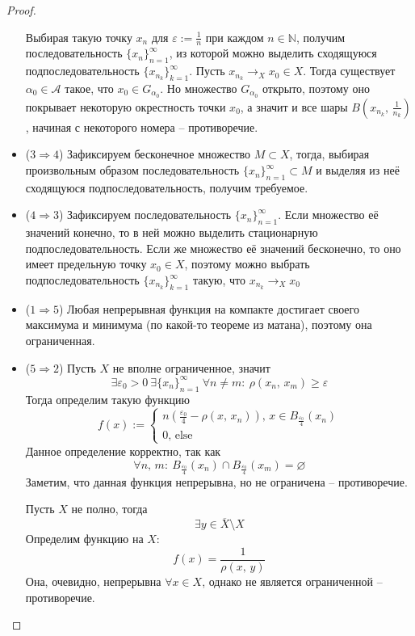 \documentclass[a4paper,12pt]{article}
\renewcommand{\geq}{\ensuremath{\geqslant}}
\renewcommand{\emptyset}{\ensuremath{\varnothing}}
\theoremstyle{plain}
\theoremstyle{definition}
\theoremstyle{remark}
\begin{document}
\begin{proof}
\begin{itemize}
		      Выбирая такую точку $x_n$ для $\varepsilon := \frac{1}{n}$ при каждом $n \in \mathbb{N}$, получим последовательность $\{x_n\}_{n = 1}^\infty$, из которой можно выделить сходящуюся подпоследовательность $\{x_{n_k}\}_{k = 1}^\infty$. Пусть $x_{n_k} \to_X x_0 \in X$.
		      Тогда существует $\alpha_0 \in \mathcal{A}$ такое, что $x_0 \in G_{\alpha_0}$. Но множество $G_{\alpha_0}$ открыто, поэтому оно покрывает некоторую окрестность точки $x_0$, а значит и все шары $B(x_{n_k},\, \frac{1}{n_k})$, начиная с некоторого номера -- противоречие.
		\item ($3 \Rightarrow 4$) Зафиксируем бесконечное множество $M \subset X$, тогда, выбирая произвольным образом последовательность $\{x_n\}_{n = 1}^\infty \subset M$ и выделяя из неё сходящуюся подпоследовательность, получим требуемое.
		\item ($4 \Rightarrow 3$) Зафиксируем последовательность $\{x_n\}_{n = 1}^\infty$. Если множество её значений конечно, то в ней можно выделить стационарную подпоследовательность. Если же множество её значений бесконечно, то оно имеет предельную точку $x_0 \in X$, поэтому можно выбрать подпоследовательность $\{x_{n_k}\}_{k=1}^\infty$ такую, что $x_{n_k} \to_X x_0$
		\item ($1 \Rightarrow 5$) Любая непрерывная функция на компакте достигает своего максимума и минимума (по какой-то теореме из матана), поэтому она ограниченная.
		\item ($5 \Rightarrow 2$) Пусть $X$ не вполне ограниченное, значит
		      \[
			      \exists \varepsilon_0 > 0 \: \exists \{x_n\}_{n = 1}^\infty \: \forall n \neq m :\: \rho(x_n,\, x_m) \geq \varepsilon
		      \]
		      Тогда определим такую функцию
		      \[
						f(x) := 
			      \begin{cases}
							n(\frac{\varepsilon_0}{4} - \rho(x,\, x_n)),\, x \in B_{\frac{\varepsilon_0}{4}}(x_n)\\
							0,\, \text{else}
			      \end{cases}
		      \]
					Данное определение корректно, так как 
					\[
						\forall n,\, m :\: B_{\frac{\varepsilon_0}{4}}(x_n) \cap B_{\frac{\varepsilon_0}{4}}(x_m) = \emptyset
					\]
					Заметим, что данная функция непрерывна, но не ограничена -- противоречие.

					Пусть $X$ не полно, тогда
					\[
						\exists y \in \overline{X} \setminus X
					\]
					Определим функцию на $X$:
					\[
						f(x) = \frac{1}{\rho(x,\, y)}
					\]
					Она, очевидно, непрерывна $\forall x \in X$, однако не является ограниченной -- противоречие.
	\end{itemize}
\end{proof}
\end{document}
